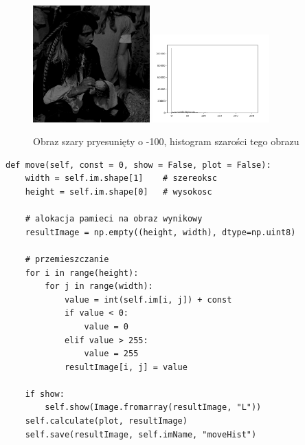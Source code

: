 \documentclass[final,a4paper,openany,12pt]{mwbk}
\begin{document}
\begin{figure}[H]
	\begin{center}
		\includegraphics[width=0.4\textwidth]{pirate_gray_moveHist_result}
		\includegraphics[width=0.4\textwidth]{pirate_gray_moveHist_histogram}
	\end{center}
	\caption{Obraz szary pryesunięty o -100, histogram szarości tego obrazu}
\end{figure}




\begin{lstlisting}[caption=Przemieszczanie histogramu]
def move(self, const = 0, show = False, plot = False):
	width = self.im.shape[1]    # szereoksc
	height = self.im.shape[0]   # wysokosc
	
	# alokacja pamieci na obraz wynikowy
	resultImage = np.empty((height, width), dtype=np.uint8)
	
	# przemieszczanie
	for i in range(height):
		for j in range(width):
			value = int(self.im[i, j]) + const
			if value < 0:
				value = 0
			elif value > 255:
				value = 255
			resultImage[i, j] = value
	
	if show:
		self.show(Image.fromarray(resultImage, "L"))
	self.calculate(plot, resultImage)
	self.save(resultImage, self.imName, "moveHist")
\end{lstlisting}

\newpage
\end{document}
